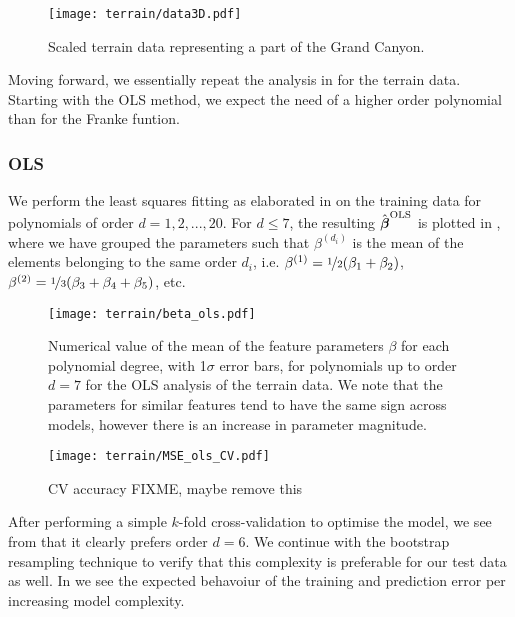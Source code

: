     \begin{figure}
        \texttt{[image: terrain/data3D.pdf]}
        \caption{Scaled terrain data representing a part of the Grand Canyon.}
        \label{fig:gc_data}
    \end{figure}

    Moving forward, we essentially repeat the analysis in  for the terrain data. Starting with the OLS method, we expect the need of a higher order polynomial than for the Franke funtion.

        \subsubsection{OLS}\label{sec:gc_olsanalysis}

        We perform the least squares fitting as elaborated in  on the training data for polynomials of order $d=1,2,..., 20$. For $d\leq 7$, the resulting $\hat{\boldsymbol{\beta}}^\text{OLS}$ is plotted in , where we have grouped the parameters such that $\beta^{(d_i)}$ is the mean of the elements belonging to the same order $d_i$, i.e. $\beta^{(1)} = \nicefrac{1}{2}(\beta_1 + \beta_2)$, $\beta^{(2)} = \nicefrac{1}{3}(\beta_3 + \beta_4 + \beta_5)$, etc. 

        \begin{figure}
            \texttt{[image: terrain/beta\_ols.pdf]}
            \caption{Numerical value of the mean of the feature parameters $\beta$ for each polynomial degree, with 1$\sigma$ error bars, for polynomials up to order $d=7$ for the OLS analysis of the terrain data. We note that the parameters for similar features tend to have the same sign across models, however there is an increase in parameter magnitude.}
            \label{fig:gc_beta_with_standard_deviation}
        \end{figure}

        
        \begin{figure}
            \texttt{[image: terrain/MSE\_ols\_CV.pdf]}
            \caption{CV accuracy FIXME, maybe remove this}
            \label{fig:gc_cv_errors_ols}
        \end{figure}

        After performing a simple $k$-fold cross-validation to optimise the model, we see from  that it clearly prefers order $d=6$. We continue with the bootstrap resampling technique to verify that this complexity is preferable for our test data as well. In  we see the expected behavoiur of the training and prediction error per increasing model complexity.
        

